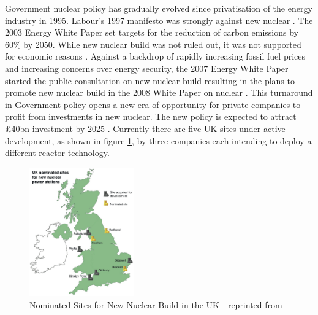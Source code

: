 Government nuclear policy has gradually evolved since privatisation of the energy industry in 1995. 
Labour’s 1997 manifesto was strongly against new nuclear \cite{Birmingham2012}. 
The 2003 Energy White Paper set targets for the reduction of carbon emissions by 60\% by 2050. 
While new nuclear build was not ruled out, it was not supported for economic reasons \cite{WP2003}. 
Against a backdrop of rapidly increasing fossil fuel prices and increasing concerns over energy security, the 2007 Energy White Paper started the public consultation on new nuclear build \cite{WP2007} resulting in the plans to promote new nuclear build in the 2008 White Paper on nuclear \cite{WP2008}.
This turnaround in Government policy opens a new era of opportunity for private companies to profit from investments in new nuclear. 
The new policy is expected to attract \pounds40bn investment by 2025 \cite{Birmingham2012}.
Currently there are five UK sites under active development, as shown in figure \ref{figure:NNB}, by three companies each intending to deploy a different reactor technology.

\begin{figure}[!h]
\centering
\includegraphics[width = 0.4\textwidth]{Figures/uk-nuclear-map.jpeg}
\caption{Nominated Sites for New Nuclear Build in the UK - reprinted from \cite{NAMRC}}
\label{figure:NNB}
\end{figure}

